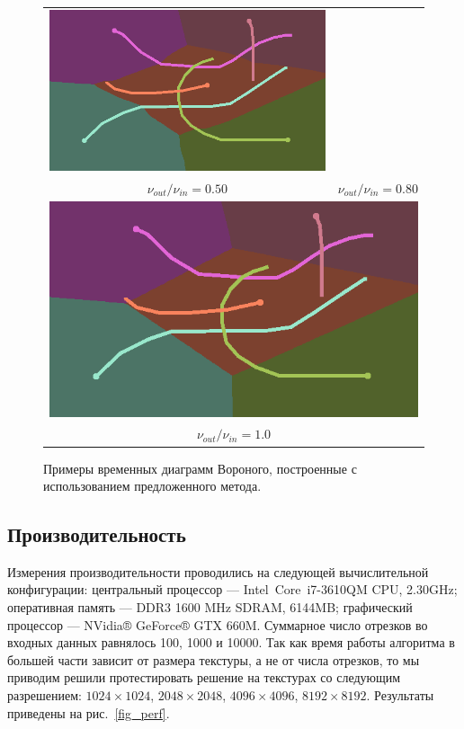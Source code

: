 \documentclass[12pt]{article}
\begin{document}
\begin{figure}
\begin{center}
\begin{tabular}{c c}
\includegraphics[scale=0.2]{sample080.png} \\
$\nu_{out} / \nu_{in} = 0.50$ & $\nu_{out} / \nu_{in} = 0.80$ \\
\multicolumn{2}{c}{\includegraphics[scale=0.2]{sample100.png}} \\
\multicolumn{2}{c}{$\nu_{out} / \nu_{in} = 1.0$}
\end{tabular}
\end{center}
\caption{Примеры временных диаграмм Вороного, построенные с использованием предложенного метода.}
\label{fig_samples}
\end{figure}

\subsection{Производительность}
Измерения производительности проводились на следующей вычислительной 
конфигурации: центральный процессор --- Intel\textregistered \,
Core\texttrademark \, i7-3610QM CPU, 2.30GHz;
оперативная память --- DDR3 1600 MHz SDRAM, 6144MB; графический процессор 
--- NVidia® GeForce® GTX 660M. Суммарное число отрезков во входных данных
равнялось 100, 1000 и 10000. Так как время работы алгоритма в большей части
зависит от размера текстуры, а не от числа отрезков, то мы приводим
решили протестировать решение на текстурах со следующим разрешением: 
$1024 \times 1024$, $2048 \times 2048$, $4096 \times 4096$, $8192 \times 8192$. 
Результаты приведены на рис.~\ref{fig_perf}.
\end{document}
